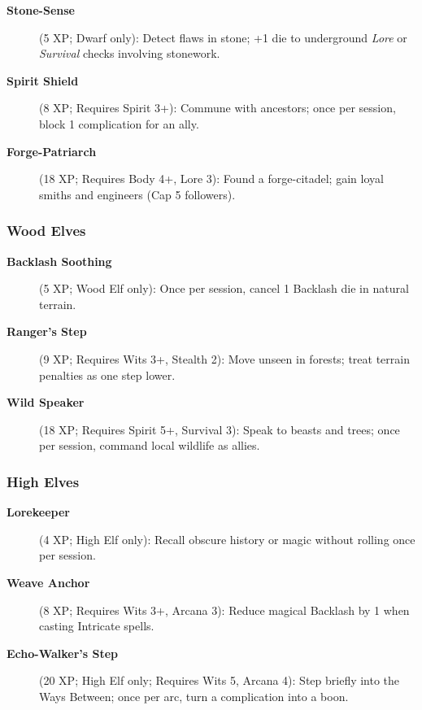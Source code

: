 \begin{description}
\item[\textbf{Stone-Sense}] (5 XP; Dwarf only): Detect flaws in stone; +1 die to underground \emph{Lore} or \emph{Survival} checks involving stonework.
\item[\textbf{Spirit Shield}] (8 XP; Requires Spirit 3+): Commune with ancestors; once per session, block 1 complication for an ally.
\item[\textbf{Forge-Patriarch}] (18 XP; Requires Body 4+, Lore 3): Found a forge-citadel; gain loyal smiths and engineers (Cap 5 followers).
\end{description}

\subsubsection{Wood Elves}
\label{subsubsec:wood-elf-talents}

\begin{description}
\item[\textbf{Backlash Soothing}] (5 XP; Wood Elf only): Once per session, cancel 1 Backlash die in natural terrain.
\item[\textbf{Ranger's Step}] (9 XP; Requires Wits 3+, Stealth 2): Move unseen in forests; treat terrain penalties as one step lower.
\item[\textbf{Wild Speaker}] (18 XP; Requires Spirit 5+, Survival 3): Speak to beasts and trees; once per session, command local wildlife as allies.
\end{description}

\subsubsection{High Elves}
\label{subsubsec:high-elf-talents}

\begin{description}
\item[\textbf{Lorekeeper}] (4 XP; High Elf only): Recall obscure history or magic without rolling once per session.
\item[\textbf{Weave Anchor}] (8 XP; Requires Wits 3+, Arcana 3): Reduce magical Backlash by 1 when casting Intricate spells.
\item[\textbf{Echo-Walker's Step}] (20 XP; High Elf only; Requires Wits 5, Arcana 4): Step briefly into the Ways Between; once per arc, turn a complication into a boon.
\end{description}

